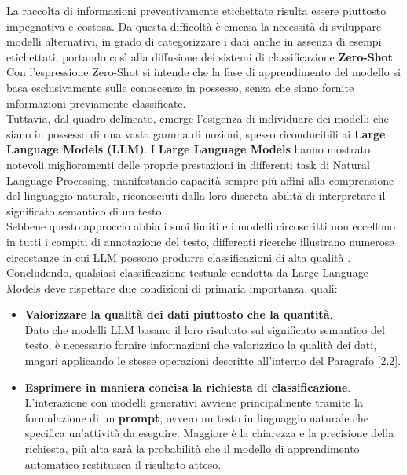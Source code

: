 La raccolta di informazioni preventivamente etichettate risulta essere piuttosto impegnativa e costosa. Da questa difficoltà è emersa la necessità di sviluppare modelli alternativi, in grado di categorizzare i dati anche in assenza di esempi etichettati, portando così alla diffusione dei sistemi di classificazione \textbf{Zero-Shot} \cite{vajjala2025textclassificationllmera}. \vspace{7pt} \\
Con l'espressione Zero-Shot si intende che la fase di apprendimento del modello si basa esclusivamente sulle conoscenze in possesso, senza che siano fornite informazioni previamente classificate.\vspace{7pt} \\
Tuttavia, dal quadro delineato, emerge l'esigenza di individuare dei modelli che siano in possesso di una vasta gamma di nozioni, spesso riconducibili ai \textbf{Large Language Models (LLM)}. I \textbf{Large Language Models} hanno mostrato notevoli miglioramenti delle proprie prestazioni in differenti task di Natural Language Processing, manifestando capacità sempre più affini alla comprensione del linguaggio naturale, riconosciuti dalla loro discreta abilità di interpretare il significato semantico di un testo \cite{vajjala2025textclassificationllmera}. \vspace{7pt} \\
Sebbene questo approccio abbia i suoi limiti e i modelli circoscritti non eccellono in tutti i compiti di annotazione del testo, differenti ricerche illustrano numerose circostanze in cui LLM possono produrre classificazioni di alta qualità \cite{pangakis2024knowledgedistillationautomatedannotation}. \vspace{7pt} \\
Concludendo, qualsiasi classificazione testuale condotta da Large Language Models deve rispettare due condizioni di primaria importanza, quali:
\begin{itemize}
    \renewcommand{\labelitemi}{-}
    \item \textbf{Valorizzare la qualità dei dati piuttosto che la quantità}. \\
    Dato che modelli LLM basano il loro risultato sul significato semantico del testo, è necessario fornire informazioni che valorizzino la qualità dei dati, magari applicando le stesse operazioni descritte all'interno del Paragrafo \ref{2.2}.
    \item \textbf{Esprimere in maniera concisa la richiesta di classificazione}. \\
    L'interazione con modelli generativi avviene principalmente tramite la formulazione di un \textbf{prompt}, ovvero un testo in linguaggio naturale che specifica un'attività da eseguire. Maggiore è la chiarezza e la precisione della richiesta, più alta sarà la probabilità che il modello di apprendimento automatico restituisca il risultato atteso.
\end{itemize}